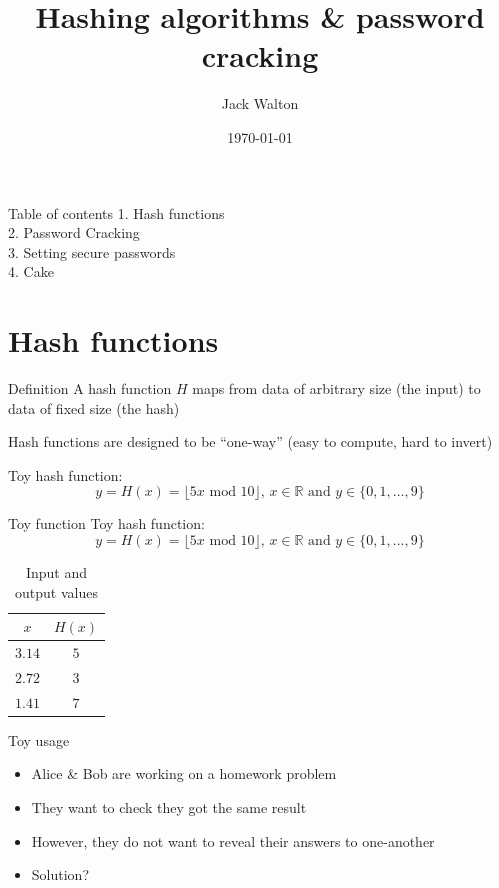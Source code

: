 \documentclass[12pt,aspectratio=169]{beamer}
\title{Hashing algorithms \& password cracking}
\author{Jack Walton}
\date{\today}
\institute{Newcastle University}
\renewcommand{\emph}[1]{{\color{mLightBrown}#1}}
\begin{document}
\maketitle

\begin{frame}{Table of contents}
\vspace*{\fill}
1. Hash functions\\[4mm]
2. Password Cracking\\[4mm]
3. Setting secure passwords\\[4mm]
4. Cake
\vfill
\end{frame}

\section{Hash functions}

\begin{frame}{Definition}
A hash function $H$ maps from data of \emph{arbitrary size} (the input) to data of \emph{fixed size} (the hash)

Hash functions are designed to be \emph{``one-way''} (easy to compute, hard to invert) 

Toy hash function:
\begin{equation*}
	y = H(x) = \lfloor 5x \text{ mod } 10 \rfloor,\, x\in\mathbb{R} \text{ and } y\in\{0,1,\ldots,9\}
\end{equation*}
\end{frame}

\begin{frame}{Toy function}
Toy hash function:
\begin{equation*}
	y = H(x) = \lfloor 5x \text{ mod } 10 \rfloor,\, x\in\mathbb{R} \text{ and } y\in\{0,1,\ldots,9\}
\end{equation*}
\begin{table}[h]
	\begin{tabular}{@{}cc@{}}
	\toprule
	$x$    & $H(x)$ \\\midrule
	$3.14$ & $5$ \\
	$2.72$ & $3$ \\
	$1.41$ & $7$ \\\bottomrule
	\end{tabular}
	\caption{Input and output values}
\end{table}
\end{frame}

\begin{frame}{Toy usage}
\begin{itemize}
	\item Alice \& Bob are working on a homework problem
	\item They want to check they got the same result
	\item However, they do not want to reveal their answers to one-another
	\item Solution? \onslide<2->{\emph{Hash and compare}}
\end{itemize}
\end{frame}
\end{document}
